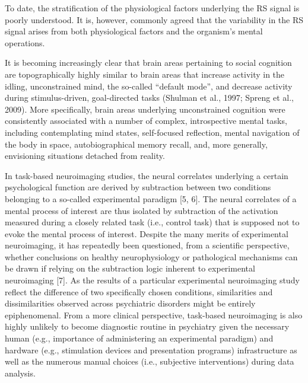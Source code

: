 \documentclass[authoryear,review,3p]{elsarticle}
\begin{document}
To date, the stratification of the physiological factors underlying the RS signal is poorly understood. It is, however, commonly agreed that the variability in the RS signal arises from both physiological factors and the organism's mental operations.

It is becoming increasingly clear that brain areas pertaining to social cognition are topographically highly similar to brain areas that increase activity in the idling, unconstrained mind, the so-called “default mode”, and decrease activity during stimulus-driven, goal-directed tasks (Shulman et al., 1997; Spreng et al., 2009). More specifically, brain areas underlying unconstrained cognition were consistently associated with a number of complex, introspective mental tasks, including contemplating mind states, self-focused reflection, mental navigation of the body in space, autobiographical memory recall, and, more generally, envisioning situations detached from reality. 

In task-based neuroimaging studies, the neural correlates underlying a certain psychological function are derived by subtraction between two conditions belonging to a so-called experimental paradigm [5, 6]. The neural correlates of a mental process of interest are thus isolated by subtraction of the activation measured during a closely related task (i.e., control task) that is supposed not to evoke the mental process of interest. Despite the many merits of experimental neuroimaging, it has repeatedly been questioned, from a scientific perspective, whether conclusions on healthy neurophysiology or pathological mechanisms can be drawn if relying on the subtraction logic inherent to experimental neuroimaging [7]. As the results of a particular experimental neuroimaging study reflect the difference of two specifically chosen conditions, similarities and dissimilarities observed across psychiatric disorders might be entirely epiphenomenal. From a more clinical perspective, task-based neuroimaging is also highly unlikely to become diagnostic routine in psychiatry given the necessary human (e.g., importance of administering an experimental paradigm) and hardware (e.g., stimulation devices and presentation programs) infrastructure as well as the numerous manual choices (i.e., subjective interventions) during data analysis.
\end{document}
